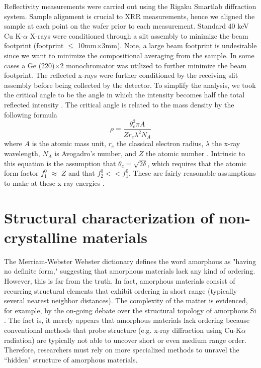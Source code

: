 Reflectivity measurements were carried out using the Rigaku Smartlab diffraction system. Sample alignment is crucial to XRR measurements, hence we aligned the sample at each point on the wafer prior to each measurement. Standard 40 keV Cu K-$\alpha$ X-rays were conditioned through a slit assembly to minimize the beam footprint (footprint $\leq$ 10mm$\times$3mm). Note, a large beam footprint is undesirable since we want to minimize the compositional averaging from the sample. In some cases a Ge (220)$\times$2 monochromator was utilized to further minimize the beam footprint. The reflected x-rays were further conditioned by the receiving slit assembly before being collected by the detector. To simplify the analysis, we took the critical angle to be the angle in which the intensity becomes half the total reflected intensity \cite{Parratt1954}. The critical angle is related to the mass density by the following formula 
\begin{equation}
\rho = \frac{\theta_{c}^{2}\pi A}{Zr_{e}\lambda^{2} N_{A}} 
\label{eq:rho}
\end{equation}
where $A$ is the atomic mass unit, $r_{e}$ the classical electron radius, $\lambda$ the x-ray wavelength, $N_{A}$ is Avogadro's number, and $Z$ the atomic number \cite{Bahr1993}. Intrinsic to this equation is the assumption that $\theta_{c} = \sqrt{2\delta}$, which requires that the atomic form factor $f^{0}_{1}$ $\approx$ $Z$ and that  $f^{0}_{2} << f^{0}_{1}$. These are fairly reasonable assumptions to make at these x-ray energies \cite{Chantler1995}.

\section{Structural characterization of non-crystalline materials}

The Merriam-Webster Webster dictionary defines the word amorphous as "having no definite form," suggesting that amorphous materials lack any kind of ordering. However, this is far from the truth. In fact, amorphous materials consist of recurring structural elements that exhibit ordering in short range (typically several nearest neighbor distances). The complexity of the matter is evidenced, for example, by the on-going debate over the structural topology of amorphous Si \cite{Treacy2012}. The fact is, it merely appears that amorphous materials lack ordering because conventional methods that probe structure (e.g. x-ray diffraction using Cu-K$\alpha$ radiation) are typically not able to uncover short or even medium range order. Therefore, researchers must rely on more specialized methods \cite{Cockayne2007} to unravel the ``hidden" structure of amorphous materials. 

